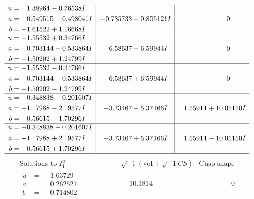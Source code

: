 \documentclass[1p]{elsarticle_modified}
\theoremstyle{definition}
\newcommand{\I}{\sqrt{-1}}
\begin{document}
$$\begin{array}{c|c|c}
\begin{aligned}
u &= \phantom{-}1.38964 - 0.76538 I \\
a &= \phantom{-}0.549515 + 0.498041 I \\
b &= -1.61522 + 1.16668 I\end{aligned}
 & -0.735733 - 0.805121 I & \phantom{-0.000000 } 0 \\ \hline\begin{aligned}
u &= -1.55532 + 0.34766 I \\
a &= \phantom{-}0.703144 + 0.533864 I \\
b &= -1.50202 + 1.24799 I\end{aligned}
 & \phantom{-}6.58637 - 6.59944 I & \phantom{-0.000000 } 0 \\ \hline\begin{aligned}
u &= -1.55532 - 0.34766 I \\
a &= \phantom{-}0.703144 - 0.533864 I \\
b &= -1.50202 - 1.24799 I\end{aligned}
 & \phantom{-}6.58637 + 6.59944 I & \phantom{-0.000000 } 0 \\ \hline\begin{aligned}
u &= -0.348838 + 0.201607 I \\
a &= -1.17988 - 2.19577 I \\
b &= \phantom{-}0.56615 - 1.70296 I\end{aligned}
 & -3.73467 - 5.37166 I & \phantom{-}1.55911 + 10.05150 I \\ \hline\begin{aligned}
u &= -0.348838 - 0.201607 I \\
a &= -1.17988 + 2.19577 I \\
b &= \phantom{-}0.56615 + 1.70296 I\end{aligned}
 & -3.73467 + 5.37166 I & \phantom{-}1.55911 - 10.05150 I\\
 \hline 
 \end{array}$$\newpage$$\begin{array}{c|c|c}  
\text{Solutions to }I^u_{1}& \I (\text{vol} + \sqrt{-1}CS) & \text{Cusp shape}\\
 \hline 
\begin{aligned}
u &= \phantom{-}1.63729\phantom{ +0.000000I} \\
a &= \phantom{-}0.262527\phantom{ +0.000000I} \\
b &= \phantom{-}0.714802\phantom{ +0.000000I}\end{aligned}
 & \phantom{-}10.1814\phantom{ +0.000000I} & \phantom{-0.000000 } 0 \\ \hline\begin{aligned}

\end{aligned}
\end{array}$$
\end{document}
